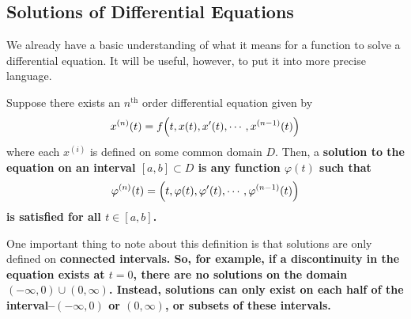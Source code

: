 \subsection{Solutions of Differential Equations}
We already have a basic understanding of what it means for a function to solve a differential equation. It will be useful, however, to put it into more precise language. 
\begin{definition}
    Suppose there exists an $n^{\text{th}}$ order differential equation given by
    \[ x^{(n)}(t) = f\pqty{t, x(t), x'(t), \cdots, x^{(n-1)}(t)} \]
    where each $x^{(i)}$ is defined on some common domain $D$. Then, a
    \bf{solution} to the equation on an interval $[a, b]\subset D$ is any function $\varphi(t)$ such that
    \[ \varphi^{(n)}(t) = \pqty{t, \varphi(t), \varphi'(t), \cdots, \varphi^{(n-1)}(t)} \]
    is satisfied for all $t\in [a,b]$.
\end{definition}
One important thing to note about this definition is that solutions are only defined on \bf{connected} intervals. So, for example, if a discontinuity in the equation exists at $t=0$, there are no solutions on the domain $(-\infty, 0)\cup (0, \infty)$. Instead, solutions can only exist on each half of the interval--$(-\infty, 0)$ or $(0, \infty)$, or subsets of these intervals.
